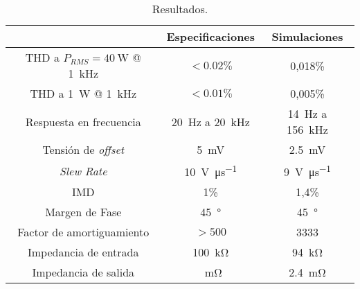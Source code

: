 \begin{table}[H]
	\centering
	\begin{tabular}{ccc}
		\toprule
		& Especificaciones & Simulaciones \\
		\midrule
		THD a $P_{\textit{RMS}} = \SI{40}{\watt}$ @ \SI{1}{\kilo\hertz}& $< \num{0.02}\%$ &  0,018\% \\
		THD a \SI{1}{\watt} @ \SI{1}{\kilo\hertz} & $< \num{0.01}\%$ & 0,005\% \\
		Respuesta en frecuencia & \SI{20}{\hertz} a \SI{20}{\kilo\hertz} & \SI{14}{\hertz} a \SI{156}{\kilo\hertz} \\
		Tensión de \textit{offset} & \SI{5}{\milli\volt} & \SI{2.5}{\milli\volt} \\
		\textit{Slew Rate} & \SI{10}{\volt\per\micro\second} &  \SI{9}{\volt\per\micro\second} \\
		IMD & 1\% & 1,4\% \\
		Margen de Fase & \SI{45}{\degree} &  \SI{45}{\degree} \\
		Factor de amortiguamiento & $>500$ & 3333 \\
		Impedancia de entrada & \SI{100}{\kilo\ohm} & \SI{94}{\kilo\ohm} \\
		Impedancia de salida & \SI{}{\milli\ohm} & \SI{2.4}{\milli\ohm}\\
		\bottomrule
	\end{tabular}
	\caption{Resultados.}
	\label{tab.resultados}
\end{table}
